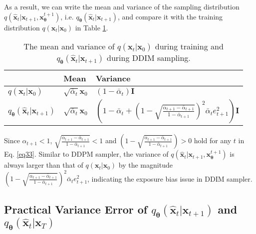 \documentclass{article} \usepackage{iclr2024_conference,times}
\begin{document}
\noindent
As a result, we can write the mean and variance of the sampling distribution $q(\hat{\pmb{x}}_{t} | \pmb{x}_{t+1}, \pmb{x}^{t+1}_{\pmb{\theta}})$, i.e. $q_{\pmb{\theta}}(\hat{\pmb{x}}_{t} | \pmb{x}_{t+1})$, and compare it with the training distribution $q(\pmb{x}_{t} | \pmb{x}_0)$ in Table \ref{tab: DDIM sampling distribution}. 

\begin{table}[ht]
\caption{
The mean and variance of $q(\pmb{x}_{t} | \pmb{x}_0)$ during training and $q_{\pmb{\theta}}(\hat{\pmb{x}}_{t} | \pmb{x}_{t+1})$ during DDIM sampling.}
\label{tab: DDIM sampling distribution}
\begin{center}
\begin{tabular}{@{}lll@{}}
\toprule
 & Mean & Variance \\ \midrule
$q(\pmb{x}_{t} | \pmb{x}_0)$ & $\sqrt{\bar{\alpha}_t} \pmb{x}_0$ & $(1-\bar{\alpha}_t) \pmb{I}$ \\
$q_{\pmb{\theta}}(\hat{\pmb{x}}_{t} | \pmb{x}_{t+1})$  & $\sqrt{\bar{\alpha}_t} \pmb{x}_0$ & $( 1-\bar{\alpha}_{t} +  (1 - \sqrt{\frac{\alpha_{t+1} - \bar{\alpha}_{t+1}}{1-\bar{\alpha}_{t+1}}} ) ^2 \bar{\alpha}_{t} e_{t+1}^2 )\pmb{I} $ \\ \bottomrule
\end{tabular}
\end{center}
\end{table}


Since $\alpha_{t+1} < 1$, $\sqrt{\frac{\alpha_{t+1} - \bar{\alpha}_{t+1}}{1-\bar{\alpha}_{t+1}}} < 1$ and $(1 - \sqrt{\frac{\alpha_{t+1} - \bar{\alpha}_{t+1}}{1-\bar{\alpha}_{t+1}}} ) > 0$ hold for any $t$ in Eq. \ref{eq33}. Similar to DDPM sampler, the variance of $q(\hat{\pmb{x}}_{t} | \pmb{x}_{t+1}, \pmb{x}^{t+1}_{\pmb{\theta}})$ is always larger than that of $q(\pmb{x}_{t} | \pmb{x}_0)$ by the magnitude $(1 - \sqrt{\frac{\alpha_{t+1} - \bar{\alpha}_{t+1}}{1-\bar{\alpha}_{t+1}}} ) ^2 \bar{\alpha}_{t} e_{t+1}^2$, indicating the exposure bias issue in DDIM sampler.




\subsection{Practical Variance Error of \texorpdfstring{$q_{\pmb{\theta}}(\hat{\pmb{x}}_{t} | \pmb{x}_{t+1})$}{Lg} and \texorpdfstring{$q_{\pmb{\theta}}(\hat{\pmb{x}}_{t} | \pmb{x}_{T})$}{Lg}}
\label{Append:2}
\end{document}
